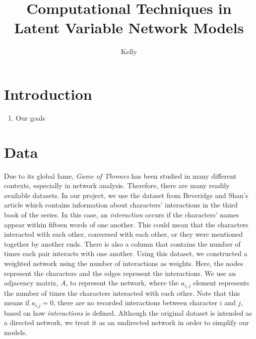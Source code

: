 \documentclass{article}
\title{Computational Techniques in Latent Variable Network Models}
\author{Kelly}
\begin{document}
\maketitle

\section{Introduction}
\begin{enumerate}
	\item Our goals 
\end{enumerate}

\section{Data}
Due to its global fame, \textit{Game of Thrones}  has been studied in many different contexts, especially in network analysis. Therefore, there are many readily available datasets. In our project, we use the dataset from Beveridge and Shan's \cite{beveridge2016network} article which contains information about characters' interactions in the third book of the series. In this case, an \textit{interaction} occurs if the characters' names appear within fifteen words of one another. This could mean that the characters interacted with each other, conversed with each other, or they were mentioned together by another ends. There is also a column that contains the number of times each pair interacts with one another. Using this dataset, we constructed a weighted network using the number of interactions as weights. Here, the nodes represent the characters and the edges represent the interactions. We use an adjacency matrix, $A$, to represent the network, where the $a_{i,j}$ element represents the number of times the characters interacted with each other. Note that this means if $a_{i.j} = 0$, there are no recorded interactions between character $i$ and $j$, based on how \textit{interactions} is defined. Although the original dataset is intended as a directed network, we treat it as an undirected network in order to simplify our models. 
\end{document}

